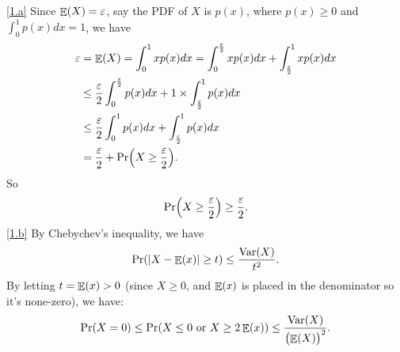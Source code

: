 \documentclass{homework}
\begin{document}
\begin{problem}\label{1}
\end{problem}

\begin{solution}
\ref{1.a}
Since $\mathop{\mathbb{E}}\displaylimits(X)=\varepsilon$, say the PDF of $X$ is $p(x)$, where $p(x)\ge 0$ and $\int_0^1 p(x)dx=1$, we have
\begin{align*}
  \varepsilon &= \mathop{\mathbb{E}}\displaylimits(X) = \int_{0}^{1}xp(x)dx = \int_{0}^{\frac{\varepsilon}{2}}xp(x)dx + \int_{\frac{\varepsilon}{2}}^1xp(x)dx\\
  &\le \frac{\varepsilon}{2}\int_{0}^{\frac{\varepsilon}{2}}p(x)dx + 1\times \int_{\frac{\varepsilon}{2}}^1p(x)dx\\
  &\le \frac{\varepsilon}{2}\int_{0}^1p(x)dx +\int_{\frac{\varepsilon}{2}}^1p(x)dx\\
  &=\frac{\varepsilon}{2} + \Pr \Bigl(X \ge \frac{\varepsilon}{2} \Bigr).
\end{align*}
So \begin{equation*}
  \Pr \Bigl(X \ge \frac{\varepsilon}{2} \Bigr) \ge \frac{\varepsilon}{2}.
\end{equation*}
\ref{1.b}
By Chebychev's inequality, we have
\begin{align*}
  \Pr(|X-\mathop{\mathbb{E}}\displaylimits(x)|\ge t)\le \frac{\mathop{\mathrm{Var}}\displaylimits(X)}{t^{2}}.
\end{align*}
By letting $t = \mathop{\mathbb{E}}\displaylimits(x)>0$ (since $X\ge 0$, and $\mathop{\mathbb{E}}\displaylimits(x)$ is placed in the denominator so it's none-zero), we have:
\begin{align*}
  \Pr(X=0)\le \Pr(X\le 0 \text{ or } X\ge 2\mathop{\mathbb{E}}\displaylimits(x)) \le \frac{\mathop{\mathrm{Var}}\displaylimits(X)}{{\bigl(\mathop{\mathbb{E}}\displaylimits(X)\bigr)}^{2}}.
\end{align*}
\end{solution}
\end{document}
